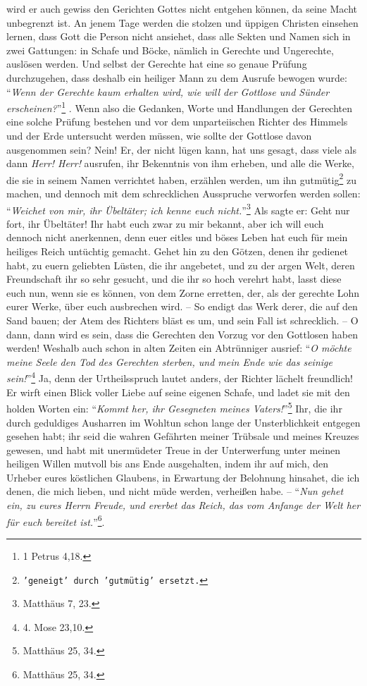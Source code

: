 wird er auch gewiss den Gerichten Gottes nicht entgehen können,
da seine Macht unbegrenzt ist. 
An jenem Tage werden die stolzen und üppigen Christen einsehen lernen, dass Gott
die Person nicht ansiehet,
dass alle Sekten und Namen sich in zwei Gattungen: 
in Schafe und Böcke, nämlich in Gerechte und Ungerechte, auslösen werden.
Und selbst der Gerechte hat eine so genaue Prüfung durchzugehen, dass deshalb ein
heiliger Mann zu dem Ausrufe bewogen wurde: "`\textit{Wenn der Gerechte kaum
erhalten wird, wie will der Gottlose und Sünder erscheinen?}"'\footnote{1
Petrus 4,18.} .
Wenn also die Gedanken, Worte und Handlungen der Gerechten eine solche Prüfung
bestehen und vor dem unparteiischen Richter des Himmels und der Erde untersucht
werden müssen, wie sollte der Gottlose davon ausgenommen sein?
Nein!
Er, der nicht lügen kann, hat uns gesagt, dass viele als dann \textit{Herr!
Herr!} ausrufen, ihr Bekenntnis von ihm erheben, und alle die Werke, die sie in
seinem Namen verrichtet haben, erzählen werden, um ihn gutmütig\footnote{\texttt{'geneigt' durch 'gutmütig' ersetzt.}} zu machen, und dennoch mit dem
schrecklichen Ausspruche verworfen werden sollen:
"`\textit{Weichet von mir, ihr Übeltäter; ich kenne euch nicht.}"'\footnote{Matthäus 7, 23.} 
Als sagte er:
Geht nur fort, ihr Übeltäter!
Ihr habt euch zwar zu mir bekannt,
aber ich will euch dennoch nicht anerkennen,
denn euer eitles und böses Leben hat euch für mein heiliges Reich untüchtig
gemacht.
Gehet hin zu den Götzen, denen ihr gedienet habt,
zu euern geliebten Lüsten, die ihr angebetet, und zu der argen Welt, deren
Freundschaft ihr so sehr gesucht, und die ihr so hoch verehrt habt,
lasst diese euch nun, wenn sie es können, von dem Zorne erretten, der, als der
gerechte Lohn eurer Werke, über euch ausbrechen wird.
-- So endigt das Werk derer, die auf den Sand bauen;
der Atem des Richters bläst es um, und sein Fall ist schrecklich.
-- O dann, dann wird es sein, dass die Gerechten den Vorzug vor den Gottlosen
haben werden!
Weshalb auch schon in alten Zeiten ein Abtrünniger ausrief:
"`\textit{O möchte meine Seele den Tod des Gerechten sterben, und mein Ende wie
das seinige sein!}"'\footnote{4. Mose 23,10.} 
Ja, denn der Urtheilsspruch lautet anders,
der Richter lächelt freundlich!
Er wirft einen Blick voller Liebe auf seine eigenen Schafe, und ladet sie mit
den holden Worten ein:
"`\textit{Kommt her, ihr Gesegneten meines Vaters!}"'\footnote{Matthäus 25,
34.} 
Ihr, die ihr durch geduldiges Ausharren im Wohltun schon lange der
Unsterblichkeit entgegen gesehen habt;
ihr seid die wahren Gefährten meiner Trübsale und meines Kreuzes gewesen, und
habt mit unermüdeter Treue in der Unterwerfung unter meinen heiligen Willen
mutvoll bis ans Ende ausgehalten, indem ihr auf mich, den Urheber eures
köstlichen Glaubens, in Erwartung der Belohnung hinsahet, die ich denen, die
mich lieben, und nicht müde werden, verheißen habe.
-- "`\textit{Nun gehet ein, zu eures Herrn Freude, und ererbet das Reich, das
vom Anfange der Welt her für euch bereitet ist.}"'\footnote{Matthäus 25, 34.}.

